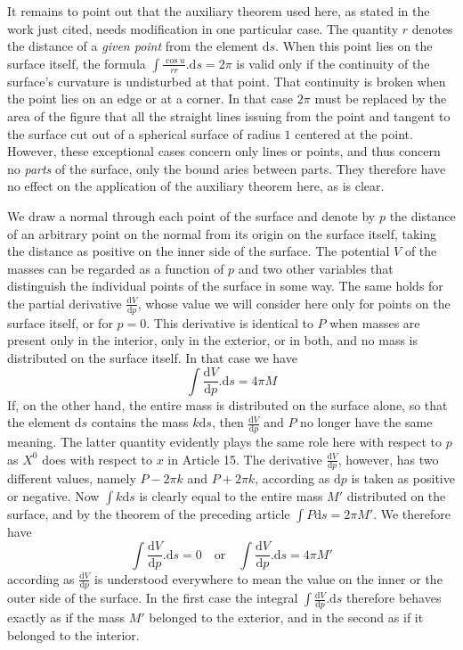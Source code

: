 It remains to point out that the auxiliary theorem used here, as stated in the work just cited, needs modification in one particular case. The quantity $r$ denotes the distance of a \textit{given point} from the element $\mathrm ds$. When this point lies on the surface itself, the formula $\int\frac{\cos u}{rr}.\mathrm ds=2\pi$ is valid only if the continuity of the surface's curvature is undisturbed at that point. That continuity is broken when the point lies on an edge or at a corner. In that case $2\pi$ must be replaced by the area of the figure that all the straight lines issuing from the point and tangent to the surface cut out of a spherical surface of radius $1$ centered at the point. However, these exceptional cases concern only lines or points, and thus concern no \textit{parts} of the surface, only the bound%
%
aries between parts. They therefore have no effect on the application of the auxiliary theorem here, as is clear.

We draw a normal through each point of the surface and denote by $p$ the distance of an arbitrary point on the normal from its origin on the surface itself, taking the distance as positive on the inner side of the surface. The potential $V$ of the masses can be regarded as a function of $p$ and two other variables that distinguish the individual points of the surface in some way. The same holds for the partial derivative $\frac{\mathrm dV}{\mathrm dp}$, whose value we will consider here only for points on the surface itself, or for $p=0$. This derivative is identical to $P$ when masses are present only in the interior, only in the exterior, or in both, and no mass is distributed on the surface itself. In that case we have
\[
\int\frac{\mathrm dV}{\mathrm dp}.\mathrm ds=4\pi M
\]
If, on the other hand, the entire mass is distributed on the surface alone, so that the element $\mathrm ds$ contains the mass $k\mathrm ds$, then $\frac{\mathrm dV}{\mathrm dp}$ and $P$ no longer have the same meaning. The latter quantity evidently plays the same role here with respect to $p$ as $X^0$ does with respect to $x$ in Article 15. The derivative $\frac{\mathrm dV}{\mathrm dp}$, however, has two different values, namely $P-2\pi k$ and $P+2\pi k$, according as $\mathrm dp$ is taken as positive or negative. Now $\int k\mathrm ds$ is clearly equal to the entire mass $M'$ distributed on the surface, and by the theorem of the preceding article $\int P\mathrm ds=2\pi M'$. We therefore have
\[
\int\frac{\mathrm dV}{\mathrm dp}.\mathrm ds=0\quad\text{or}\quad\int\frac{\mathrm dV}{\mathrm dp}.\mathrm ds=4\pi M'
\]
according as $\frac{\mathrm dV}{\mathrm dp}$ is understood everywhere to mean the value on the inner or the outer side of the surface. In the first case the integral $\int\frac{\mathrm dV}{\mathrm dp}.\mathrm ds$ therefore behaves exactly as if the mass $M'$ belonged to the exterior, and in the second as if it belonged to the interior.

